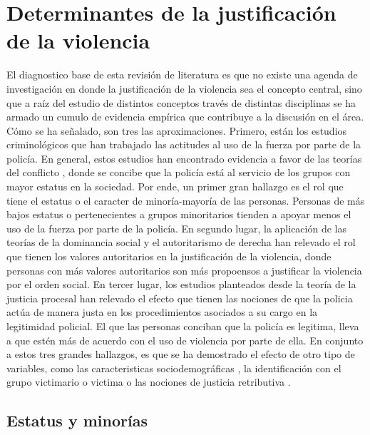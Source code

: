 \documentclass[12pt,twoside]{templates/facsothesis}
\begin{document}
\hypertarget{determinantes-de-la-justificaciuxf3n-de-la-violencia}{%
\section{Determinantes de la justificación de la violencia}\label{determinantes-de-la-justificaciuxf3n-de-la-violencia}}

El diagnostico base de esta revisión de literatura es que no existe una agenda de investigación en donde la justificación de la violencia sea el concepto central, sino que a raíz del estudio de distintos conceptos través de distintas disciplinas se ha armado un cumulo de evidencia empírica que contribuye a la discusión en el área. Cómo se ha señalado, son tres las aproximaciones. Primero, están los estudios criminológicos que han trabajado las actitudes al uso de la fuerza por parte de la policía. En general, estos estudios han encontrado evidencia a favor de las teorías del conflicto \citep{Chambliss1995, Quinney1971, Turk1969}, donde se concibe que la policía está al servicio de los grupos con mayor estatus en la sociedad. Por ende, un primer gran hallazgo es el rol que tiene el estatus o el caracter de minoría-mayoría de las personas. Personas de más bajos estatus o pertenecientes a grupos minoritarios tienden a apoyar menos el uso de la fuerza por parte de la policía. En segundo lugar, la aplicación de las teorías de la dominancia social \citep{Sidanius1999} y el autoritarismo de derecha \citep{Altemeyer1988} han relevado el rol que tienen los valores autoritarios en la justificación de la violencia, donde personas con más valores autoritarios son más propoensos a justificar la violencia por el orden social. En tercer lugar, los estudios planteados desde la teoría de la justicia procesal \citep{Tyler2006} han relevado el efecto que tienen las nociones de que la policia actúa de manera justa en los procedimientos asociados a su cargo en la legitimidad policial. El que las personas conciban que la policía es legitima, lleva a que estén más de acuerdo con el uso de violencia por parte de ella. En conjunto a estos tres grandes hallazgos, es que se ha demostrado el efecto de otro tipo de variables, como las caracteristicas sociodemográficas \citep{Gamson1970, Blumenthal1972, Arthur1994, Thompson2004, Gerber2017}, la identificación con el grupo victimario o victima \citep{Bradford2017, Gerber2017a} o las nociones de justicia retributiva \citep{Blumenthal1972, Puga2016}.

\hypertarget{estatus-y-minoruxedas}{%
\subsection{Estatus y minorías}\label{estatus-y-minoruxedas}}
\end{document}
